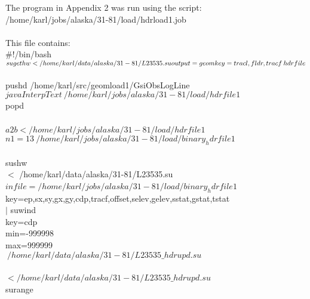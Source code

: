 The  program in Appendix 2 was run using the script: \\
/home/karl/jobs/alaska/31-81/load/hdrload1.job  \\
 \\
This file contains: \\
\#!/bin/bash \\
$sugethw < /home/karl/data/alaska/31-81/L23535.su \ \\
    output=geom key=tracl,fldr,tracf \> hdrfile $ \\
 \\
pushd /home/karl/src/geomload1/GsiObsLogLine \\
$java InterpText \>/home/karl/jobs/alaska/31-81/load/hdrfile1$ \\
popd \\
 \\
$a2b < /home/karl/jobs/alaska/31-81/load/hdrfile1$ \ \\
  $ n1=13 \>/home/karl/jobs/alaska/31-81/load/binary_hdrfile1$		 \\
 \\
sushw \ \\
    $<$ /home/karl/data/alaska/31-81/L23535.su \ \\
   $ infile=/home/karl/jobs/alaska/31-81/load/binary_hdrfile1$ \ \\
    key=ep,sx,sy,gx,gy,cdp,tracf,offset,selev,gelev,sstat,gstat,tstat \ \\
$|$ suwind \ \\
    key=cdp \ \\
    min=-999998 \ \\
    max=999999 \ \\
$\>/home/karl/data/alaska/31-81/L23535\_hdrupd.su$ \\
 \\
$</home/karl/data/alaska/31-81/L23535\_hdrupd.su$ \ \\
    surange